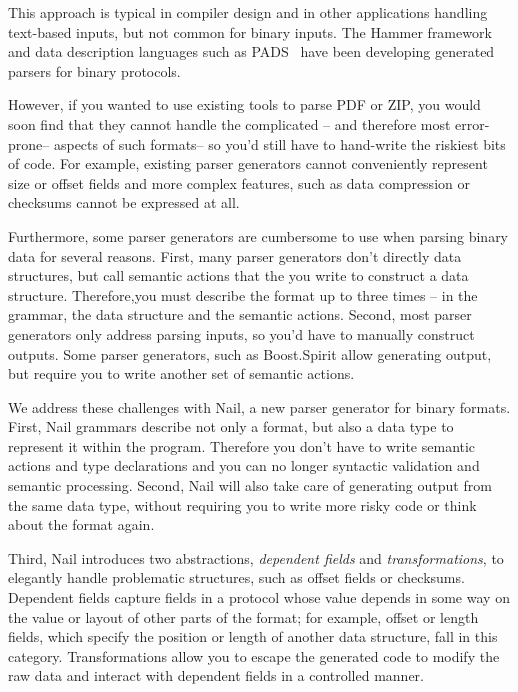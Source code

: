 This approach is typical in compiler design and in other applications handling text-based inputs, but not
common for binary inputs. The Hammer framework~\cite{hammer-parser} and data description languages such as
PADS~\cite{Fisher:2005:PDL:1064978.1065046} have been developing generated parsers for binary protocols.

However, if you wanted to use existing tools to parse PDF
or ZIP, you would soon find that they cannot handle the complicated -- and therefore most
error-prone-- aspects of such formats-- so you'd still have to
hand-write the riskiest bits of code. For example, existing parser generators cannot conveniently represent size or offset fields and more complex features, such as data compression or checksums cannot be expressed at all.

Furthermore, some parser generators are cumbersome to use when parsing binary data for several
reasons. First, many parser generators don't directly data structures, but call semantic actions
that the you write to construct a data structure. Therefore,you must
describe the format up to three times -- in the grammar, the data structure and the semantic
actions. Second, most parser generators only address parsing inputs, so you'd have to manually
construct outputs. Some parser generators, such as 
Boost.Spirit  allow generating output, but require you to write another set of semantic actions.


We address these challenges with Nail, a new parser generator for binary formats.
First, Nail grammars describe not only a format, but also a data type to represent it within the program.
Therefore you don't have to write semantic actions and type declarations and you can no longer syntactic validation and semantic processing.
Second, Nail will also take care of generating output from the same data type, without requiring you
to write more risky code or think about the format again.

Third,  Nail introduces two abstractions, \emph{dependent fields} and
\emph{transformations}, to elegantly handle problematic structures,
such as offset fields or checksums.  Dependent fields capture fields
in a protocol whose value depends in some way on the value or layout
of other parts of the format; for example, offset or length fields,
which specify the position or length of another data structure, fall
in this category.  Transformations allow you to escape the
generated code to modify the raw data and interact with dependent fields
in a controlled manner.

